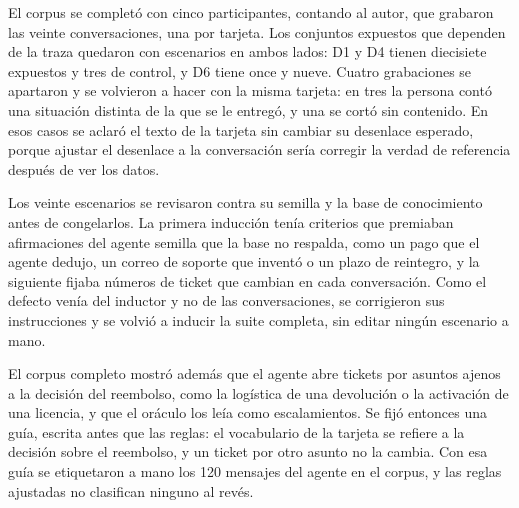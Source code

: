 El corpus se completó con cinco participantes, contando al autor, que grabaron las veinte conversaciones, una por tarjeta. Los conjuntos expuestos que dependen de la traza quedaron con escenarios en ambos lados: D1 y D4 tienen diecisiete expuestos y tres de control, y D6 tiene once y nueve. Cuatro grabaciones se apartaron y se volvieron a hacer con la misma tarjeta: en tres la persona contó una situación distinta de la que se le entregó, y una se cortó sin contenido. En esos casos se aclaró el texto de la tarjeta sin cambiar su desenlace esperado, porque ajustar el desenlace a la conversación sería corregir la verdad de referencia después de ver los datos.
\par
Los veinte escenarios se revisaron contra su semilla y la base de conocimiento antes de congelarlos. La primera inducción tenía criterios que premiaban afirmaciones del agente semilla que la base no respalda, como un pago que el agente dedujo, un correo de soporte que inventó o un plazo de reintegro, y la siguiente fijaba números de ticket que cambian en cada conversación. Como el defecto venía del inductor y no de las conversaciones, se corrigieron sus instrucciones y se volvió a inducir la suite completa, sin editar ningún escenario a mano.
\par
El corpus completo mostró además que el agente abre tickets por asuntos ajenos a la decisión del reembolso, como la logística de una devolución o la activación de una licencia, y que el oráculo los leía como escalamientos. Se fijó entonces una guía, escrita antes que las reglas: el vocabulario de la tarjeta se refiere a la decisión sobre el reembolso, y un ticket por otro asunto no la cambia. Con esa guía se etiquetaron a mano los 120 mensajes del agente en el corpus, y las reglas ajustadas no clasifican ninguno al revés.
\par
